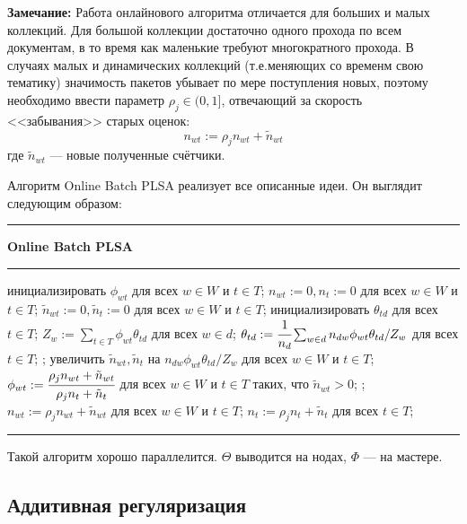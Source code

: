{\bf Замечание:} Работа онлайнового алгоритма отличается для больших и малых коллекций. Для большой коллекции достаточно одного прохода по всем документам, в то время как маленькие требуют многократного прохода. В случаях малых и динамических коллекций (т.е.меняющих со временм свою тематику) значимость пакетов убывает по мере поступления новых, поэтому необходимо ввести параметр $\rho_j \in (0,1]$, отвечающий за скорость <<забывания>> старых оценок: 
\[
	n_{wt} := \rho_j n_{wt} + \tilde n_{wt}
\] 
где $\tilde n_{wt}$ --- новые полученные счётчики.

Алгоритм Online Batch PLSA реализует все описанные идеи. Он выглядит следующим образом:

\vspace{10pt}
\hrule 
{\bf Online Batch PLSA}
\vspace{4pt}

\hrule
\vspace{10pt}

\begin{algorithmic}[1]
\STATE инициализировать $\phi_{wt}$ для всех $w \in W$ и $t \in T$;
\STATE $n_{wt} := 0, n_t := 0$ для всех $w \in W$ и $t \in T$;
	\REPEAT
		\STATE $\tilde n_{wt} := 0, \tilde n_t := 0$ для всех $w \in W$ и $t \in T$;
			\STATE инициализировать $\theta_{td}$ для всех $t \in T$;
			\REPEAT
				\STATE $Z_w := \sum_{t \in T} \phi_{wt} \theta_{td}$ для всех $w \in d$;
				\STATE $\theta_{td} := \cfrac{1}{n_d} \sum_{w \in d} n_{dw} \phi_{wt} \theta_{td} / Z_w$ для всех $t \in T$;
			;
			\STATE увеличить $\tilde n_{wt}, \tilde n_t$ на $n_{dw} \phi_{wt} \theta_{td} / Z_w$ для всех $w \in W$ и $t \in T$;
		\ENDFOR
		\STATE $\phi_{wt} := \cfrac{\rho_j n_{wt} + \tilde n_{wt}}{\rho_j n_{t} + \tilde n_{t}}$ для всех $w \in W$ и $t \in T$ таких, что $\tilde n_{wt} > 0$;
	;
	\STATE $n_{wt} := \rho_j n_{wt} + \tilde n_{wt}$ для всех $w \in W$ и $t \in T$;
	\STATE $n_t := \rho_j n_t + \tilde n_t$ для всех $t \in T$;
\ENDFOR
\end{algorithmic}

\vspace{10pt}
\hrule


Такой алгоритм хорошо параллелится. $\Theta$ выводится на нодах, $\Phi$ --- на мастере.

\subsection{Аддитивная регуляризация}

